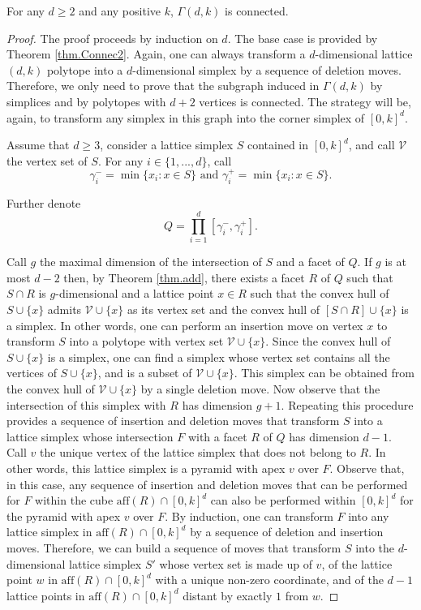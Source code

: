 \begin{theorem}\label{lem.Connecd}
For any $d\geq2$ and any positive $k$, $\Gamma(d,k)$ is connected.
\end{theorem}
\begin{proof}
The proof proceeds by induction on $d$. The base case is provided by Theorem \ref{thm.Connec2}. Again, one can always transform a $d$-dimensional lattice $(d,k)$ polytope into a $d$-dimensional simplex by a sequence of deletion moves. Therefore, we only need to prove that the subgraph induced in $\Gamma(d,k)$ by simplices and by polytopes with $d+2$ vertices is connected. The strategy will be, again, to transform any simplex in this graph into the corner simplex of $[0,k]^d$.

Assume that $d\geq3$, consider a lattice simplex $S$ contained in $[0,k]^d$, and call $\mathcal{V}$ the vertex set of $S$. For any $i\in\{1, ..., d\}$, call
$$
\gamma_i^-=\min\{x_i:x\in{S}\}\mbox{ and }\gamma_i^+=\min\{x_i:x\in{S}\}\mbox{.}
$$

Further denote
$$
Q=\prod_{i=1}^d[\gamma_i^-,\gamma_i^+]\mbox{.}
$$

Call $g$ the maximal dimension of the intersection of $S$ and a facet of $Q$. If $g$ is at most $d-2$ then, by Theorem \ref{thm.add}, there exists a facet $R$ of $Q$ such that $S\cap{R}$ is $g$-dimensional and a lattice point $x\in{R}$ such that the convex hull of $S\cup\{x\}$ admits $\mathcal{V}\cup\{x\}$ as its vertex set and the convex hull of $[S\cap{R}]\cup\{x\}$ is a simplex. In other words, one can perform an insertion move on vertex $x$ to transform $S$ into a polytope with vertex set $\mathcal{V}\cup\{x\}$. Since the convex hull of $S\cup\{x\}$ is a simplex, one can find a simplex whose vertex set contains all the vertices of $S\cup\{x\}$, and is a subset of $\mathcal{V}\cup\{x\}$. This simplex can be obtained from the convex hull of $\mathcal{V}\cup\{x\}$ by a single deletion move. Now observe that the intersection of this simplex with $R$ has dimension $g+1$. Repeating this procedure provides a sequence of insertion and deletion moves that transform $S$ into a lattice simplex whose intersection $F$ with a facet $R$ of $Q$ has dimension $d-1$. Call $v$ the unique vertex of the lattice simplex that does not belong to $R$. In other words, this lattice simplex is a pyramid with apex $v$ over $F$. Observe that, in this case, any sequence of insertion and deletion moves that can be performed for $F$ within the cube $\mathrm{aff}(R)\cap[0,k]^d$ can also be performed within $[0,k]^d$ for the pyramid with apex $v$ over $F$. By induction, one can transform $F$ into any lattice simplex in $\mathrm{aff}(R)\cap[0,k]^d$ by a sequence of deletion and insertion moves. Therefore, we can build a sequence of moves that transform $S$ into the $d$-dimensional lattice simplex $S'$ whose vertex set is made up of $v$, of the lattice point $w$ in $\mathrm{aff}(R)\cap[0,k]^d$ with a unique non-zero coordinate, and of the $d-1$ lattice points in $\mathrm{aff}(R)\cap[0,k]^d$ distant by exactly $1$ from $w$.


\end{proof}
